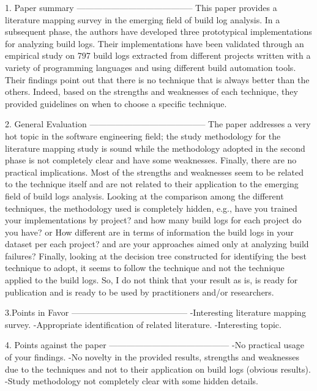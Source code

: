 \documentclass[10pt,a4wide]{article}
\renewenvironment{leftbar}{%
	\vspace{0.1cm}
	\def\FrameCommand{\vrule width 0.4pt \hspace{15pt}}%
	\MakeFramed {\advance\hsize-\width \FrameRestore}}%
{\endMakeFramed\vspace{0.1cm}}
\begin{document}
\begin{leftbar}
1. Paper summary
-----------------------------------------
This paper provides a literature mapping survey in the emerging field of build log analysis. In a subsequent phase, the authors have developed three prototypical implementations for analyzing build logs. Their implementations have been validated through an empirical study on 797 build logs extracted from different projects written with a variety of programming languages and using different build automation tools.
Their findings point out that there is no technique that is always better than the others. Indeed, based on the strengths and weaknesses of each technique, they provided guidelines on when to choose a specific technique.

2. General Evaluation
-----------------------------------------
The paper addresses a very hot topic in the software engineering field; the study methodology for the literature mapping study is sound while the methodology adopted in the second phase is not completely clear and have some weaknesses. Finally, there are no practical implications. Most of the strengths and weaknesses seem to be related to the technique itself and are not related to their application to the emerging field of build logs analysis.
Looking at the comparison among the different techniques, the methodology used is completely hidden, e.g., have you trained your implementations by project? and how many build logs for each project do you have? or How different are in terms of information the build logs in your dataset per each project? and are your approaches aimed only at analyzing build failures?
Finally, looking at the decision tree constructed for identifying the best technique to adopt, it seems to follow the technique and not the technique applied to the build logs. So, I do not think that your result as is, is ready for publication and is ready to be used by practitioners and/or researchers.

3.Points in Favor
-----------------------------------------
-Interesting literature mapping survey.
-Appropriate identification of related literature.
-Interesting topic.

4. Points against the paper
------------------------------------------
-No practical usage of your findings.
-No novelty in the provided results, strengths and weaknesses due to the techniques and not to their application on build logs (obvious results).
-Study methodology not completely clear with some hidden details.


\end{leftbar}
\end{document}
